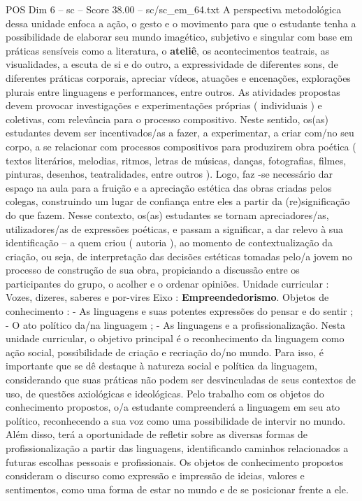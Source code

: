 \begin{textsample}{POS Dim 6 – sc – Score 38.00 – sc/sc\_em\_64.txt}
A perspectiva metodológica dessa unidade enfoca a ação, o gesto e o movimento para que o estudante tenha a possibilidade de elaborar seu mundo imagético, subjetivo e singular com base em práticas sensíveis como a literatura, o \textbf{ateliê}, os acontecimentos teatrais, as visualidades, a escuta de si e do outro, a expressividade de diferentes sons, de diferentes práticas corporais, apreciar vídeos, atuações e encenações, explorações plurais entre linguagens e performances, entre outros.
As atividades propostas devem provocar investigações e experimentações próprias ( individuais ) e coletivas, com relevância para o processo compositivo.
Neste sentido, os(as) estudantes devem ser incentivados/as a fazer, a experimentar, a criar com/no seu corpo, a se relacionar com processos compositivos para produzirem obra poética ( textos literários, melodias, ritmos, letras de músicas, danças, fotografias, filmes, pinturas, desenhos, teatralidades, entre outros ).
Logo, faz -se necessário dar espaço na aula para a fruição e a apreciação estética das obras criadas pelos colegas, construindo um lugar de confiança entre eles a partir da (re)significação do que fazem.
Nesse contexto, os(as) estudantes se tornam apreciadores/as, utilizadores/as de expressões poéticas, e passam a significar, a dar relevo à sua identificação – a quem criou ( autoria ), ao momento de contextualização da criação, ou seja, de interpretação das decisões estéticas tomadas pelo/a jovem no processo de construção de sua obra, propiciando a discussão entre os participantes do grupo, o acolher e o ordenar opiniões.
Unidade curricular : Vozes, dizeres, saberes e por-vires Eixo : \textbf{Empreendedorismo}.
Objetos de conhecimento : - As linguagens e suas potentes expressões do pensar e do sentir ; - O ato político da/na linguagem ; - As linguagens e a profissionalização.
Nesta unidade curricular, o objetivo principal é o reconhecimento da linguagem como ação social, possibilidade de criação e recriação do/no mundo.
Para isso, é importante que se dê destaque à natureza social e política da linguagem, considerando que suas práticas não podem ser desvinculadas de seus contextos de uso, de questões axiológicas e ideológicas.
Pelo trabalho com os objetos do conhecimento propostos, o/a estudante compreenderá a linguagem em seu ato político, reconhecendo a sua voz como uma possibilidade de intervir no mundo.
Além disso, terá a oportunidade de refletir sobre as diversas formas de profissionalização a partir das linguagens, identificando caminhos relacionados a futuras escolhas pessoais e profissionais.
Os objetos de conhecimento propostos consideram o discurso como expressão e impressão de ideias, valores e sentimentos, como uma forma de estar no mundo e de se posicionar frente a ele.

\end{textsample}
